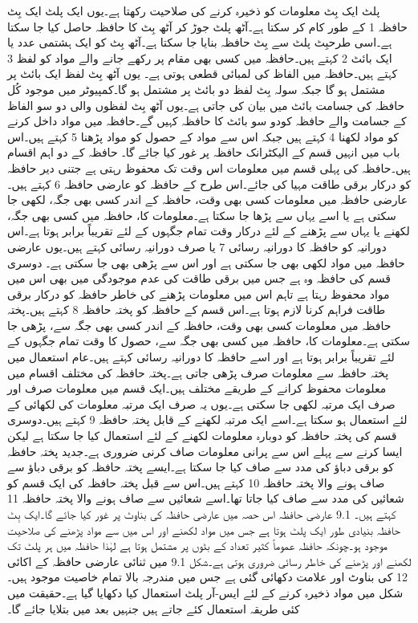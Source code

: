 	پلٹ ایک بِٹ معلومات کو ذخیرہ کرنے کی صلاحیت رکھتا ہے۔یوں ایک پلٹ ایک بِٹ حافظہ 1 کے طور کام کر سکتا ہے۔آٹھ پلٹ جوڑ کر آٹھ بِٹ کا حافظہ حاصل کیا جا سکتا ہے۔اسی طرحبِٹ پلٹ سے بِٹ حافظہ بنایا جا سکتا ہے۔آٹھ بِٹ کو ایک ہشتمی عدد یا ایک بائٹ 2 کہتے ہیں۔حافظہ میں کسی بھی مقام پر رکھے جانے والے مواد کو لفظ 3 کہتے ہیں۔حافظہ میں الفاظ کی لمبائی قطعی ہوتی ہے۔ یوں آٹھ بِٹ لفظ ایک بائٹ پر مشتمل ہو گا جبکہ سولہ بِٹ لفظ دو بائٹ پر مشتمل ہو گا۔کمپیوٹر میں موجود کُل حافظہ کی جسامت بائٹ میں بیان کی جاتی ہے۔یوں آٹھ بِٹ لفظوں والی دو سو الفاظ کے جسامت والے حافظہ کودو سو بائٹ کا حافظہ کہیں گے۔حافظہ میں مواد داخل کرنے کو مواد لکھنا 4 کہتے ہیں جبکہ اس سے مواد کے حصول کو مواد پڑھنا 5 کہتے ہیں۔اس باب میں انہیں قسم کے الیکٹرانک حافظہ پر غور کیا جائے گا۔
	حافظہ کے دو اہم اقسام ہیں۔حافظہ کی پہلی قسم میں معلومات اس وقت تک محفوظ رہتی ہے جتنی دیر حافظہ کو درکار برقی طاقت مہیا کی جائے۔اس طرح کے حافظہ کو عارضی حافظہ 6 کہتے ہیں۔ عارضی حافظہ میں معلومات کسی بھی وقت، حافظہ کے اندر کسی بھی جگہ، لکھی جا سکتی ہے یا اسے یہاں سے پڑھا جا سکتا ہے۔معلومات کا، حافظہ میں کسی بھی جگہ، لکھنے یا یہاں سے پڑھنے کے لئے درکار وقت تمام جگہوں کے لئے تقریباً برابر ہوتا ہے۔اس دورانیہ کو حافظہ کا دورانیہ رسائی 7 یا صرف دورانیہ رسائی کہتے ہیں۔یوں عارضی حافظہ میں مواد لکھی بھی جا سکتی ہے اور اس سے پڑھی بھی جا سکتی ہے۔
	دوسری قسم کی حافظہ وہ ہے جس میں برقی طاقت کی عدم موجودگی میں بھی اس میں مواد محفوظ رہتا ہے تاہم اس میں معلومات پڑھنے کی خاطر حافظہ کو درکار برقی طاقت فراہم کرنا لازم  ہوتا ہے۔اس قسم کے حافظہ کو پختہ حافظہ 8 کہتے ہیں۔پختہ حافظہ میں معلومات کسی بھی وقت، حافظہ کے اندر کسی بھی جگہ سے، پڑھی جا سکتی ہے۔معلومات کا، حافظہ میں کسی بھی جگہ سے، حصول کا وقت تمام جگہوں کے لئے تقریباً برابر ہوتا ہے اور اسے حافظہ کا دورانیہ رسائی کہتے ہیں۔عام استعمال میں پختہ حافظہ سے معلومات صرف پڑھی جاتی ہے۔پختہ حافظہ کی مختلف اقسام میں معلومات محفوظ کرانے کے طریقے مختلف ہیں۔ایک قسم میں معلومات صرف اور صرف ایک مرتبہ لکھی جا سکتی ہے۔یوں یہ صرف ایک مرتبہ معلومات کی لکھائی کے لئے استعمال ہو سکتا ہے۔اسے ایک مرتبہ لکھنے کے قابل پختہ حافظہ 9 کہتے ہیں۔دوسری قسم کی پختہ حافظہ کو دوبارہ معلومات لکھنے کے لئے استعمال کیا جا سکتا ہے لیکن ایسا کرنے سے پہلے اس سے پرانی معلومات صاف کرنی ضروری ہے۔جدید پختہ حافظہ کو برقی دباؤ کی مدد سے صاف کیا جا سکتا ہے۔ایسے پختہ حافظہ کو برقی دباؤ سے صاف ہونے والا پختہ حافظہ 10 کہتے ہیں۔اس سے قبل پختہ حافظہ کی ایک قسم کو شعائیں کی مدد سے صاف کیا جاتا تھا۔اسے شعائیں سے صاف ہونے والا پختہ حافظہ 11 کہتے ہیں۔
9.1 عارضی حافظہ
	اس حصہ میں عارضی حافظہ کی بناوٹ پر غور کیا جائے گا۔ایک بِٹ حافظہ بنیادی طور ایک پلٹ ہوتا ہے جس میں مواد لکھنے اور اس میں سے مواد پڑھنے کی صلاحیت موجود ہو۔چونکہ حافظہ عموماً کثیر تعداد کے بٹوں پر مشتمل ہوتا ہے لہٰذا حافظہ میں ہر پلٹ تک لکھنے اور پڑھنے کی خاطر رسائی ضروری ہوتی ہے۔شکل 9.1 میں ثنائی عارضی حافظہ کے اکائی 12 کی بناوٹ اور علامت دکھائی گئی ہے جس میں مندرجہ بالا تمام خاصیت موجود ہیں۔شکل میں مواد ذخیرہ کرنے کے لئے ایس-آر پلٹ استعمال کیا دکھایا گیا ہے۔حقیقت میں کئی طریقہ استعمال کئے جاتے ہیں جنہیں بعد میں بتلایا جائے گا۔ 


